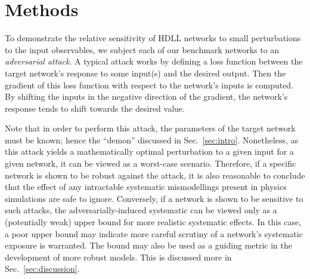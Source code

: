\documentclass[reprint,nofootinbib,...]{revtex4-1}
\newcommand{\ntrain}{145k}       %
\newcommand{\nval}{26k}            %
\newcommand{\aucCLS}{0.88}    %
\begin{document}

\section{Methods}
To demonstrate the relative sensitivity of HDLL networks to small perturbations to the input observables, we subject each of our benchmark networks to an \textit{adversarial attack}.
A typical attack works by defining a loss function between the target network's response to some input(s) and the desired output.
Then the gradient of this loss function with respect to the network's inputs is computed.
By shifting the inputs in the negative direction of the gradient, the network's response tends to shift towards the desired value.

Note that in order to perform this attack, the parameters of the target network must be known; hence the ``demon'' discussed in Sec.~\ref{sec:intro}.
Nonetheless, as this attack yields a mathematically optimal perturbation to a given input for a given network, it can be viewed as a worst-case scenario.
Therefore, if a specific network is shown to be robust against the attack, it is also reasonable to conclude that the effect of any intractable systematic mismodellings present in physics simulations are safe to ignore.
Conversely, if a network is shown to be sensitive to such attacks, the adversarially-induced systematic can be viewed only as a (potentially weak) upper bound for more realistic systematic effects.
In this case, a poor upper bound may indicate more careful scrutiny of a network's systematic exposure is warranted.
The bound may also be used as a guiding metric in the development of more robust models.  This is discussed more in Sec.~\ref{sec:discussion}.
\end{document}
